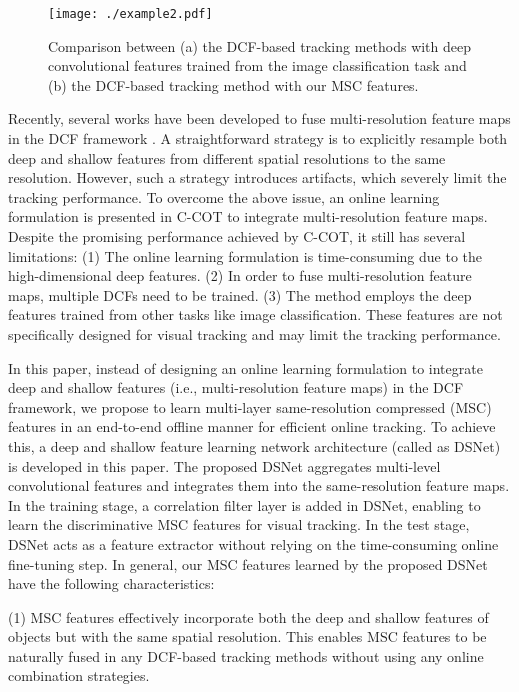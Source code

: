 \documentclass[runningheads]{llncs}
\begin{document}
\begin{figure*}[!tp]
\begin{center}
   \texttt{[image: ./example2.pdf]} %
\end{center}
 \caption{Comparison between (a) the DCF-based tracking methods \cite{CCOT,HCF} with deep convolutional features trained from the image classification task and (b) the DCF-based tracking method with our MSC features. 
 }
\label{Fig:example}
\end{figure*}

Recently, several works have been developed to fuse multi-resolution feature maps in the DCF framework \cite{ECO,CCOT}. A straightforward strategy is to explicitly resample both deep and shallow features from different spatial resolutions to the same resolution. However, such a strategy introduces artifacts, which severely limit the tracking performance. To overcome the above issue, an online learning formulation is presented in C-COT \cite{CCOT} to integrate multi-resolution feature maps. Despite the promising performance achieved by C-COT, it still has several limitations: (1) The online learning formulation is time-consuming due to the high-dimensional deep features. (2) In order to fuse multi-resolution feature maps, multiple DCFs need to be trained. (3) The method employs the deep features trained from other tasks like image classification. These features are not specifically designed for visual tracking and may limit the tracking performance. 

In this paper, instead of designing an online learning formulation to integrate deep and shallow features (i.e., multi-resolution feature maps) in the DCF framework, we propose to learn multi-layer same-resolution compressed (MSC) features in an end-to-end offline manner for efficient online tracking. To achieve this, a deep and shallow feature learning network architecture (called as DSNet) is developed in this paper. The proposed DSNet aggregates multi-level convolutional features and integrates them into the same-resolution feature maps. In the training stage, a correlation filter layer is added in DSNet, enabling to learn the discriminative MSC features for visual tracking. In the test stage, DSNet acts as a feature extractor without relying on the time-consuming online fine-tuning step. In general, our MSC features learned by the proposed DSNet have the following characteristics: 

(1) MSC features effectively incorporate both the deep and shallow features of objects but with the same spatial resolution. This enables MSC features to be naturally fused in any DCF-based tracking methods without using any online combination strategies.
\end{document}
